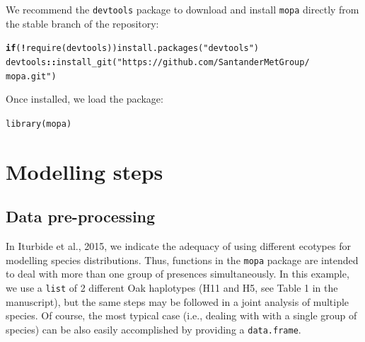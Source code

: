 \documentclass[10pt,a4paper]{article}\usepackage[]{graphicx}\usepackage[]{color}
\makeatletter
\newcommand{\hlstr}[1]{\textcolor[rgb]{0.667,0.267,0}{#1}}%
\newcommand{\hlopt}[1]{\textcolor[rgb]{0,0,0}{\textbf{#1}}}%
\newcommand{\hlstd}[1]{\textcolor[rgb]{0,0,0}{#1}}%
\newcommand{\hlkwa}[1]{\textcolor[rgb]{0.4,0.067,0.067}{\textbf{#1}}}%
\newcommand{\hlkwd}[1]{\textcolor[rgb]{0,0.267,0.4}{#1}}%
\newenvironment{kframe}{%
 \def\at@end@of@kframe{}%
 \ifinner\ifhmode%
  \def\at@end@of@kframe{\end{minipage}}%
  \begin{minipage}{\columnwidth}%
 \fi\fi%
 \def\FrameCommand##1{\hskip\@totalleftmargin \hskip-\fboxsep
 \colorbox{shadecolor}{##1}\hskip-\fboxsep
     \hskip-\linewidth \hskip-\@totalleftmargin \hskip\columnwidth}%
 \MakeFramed {\advance\hsize-\width
   \@totalleftmargin\z@ \linewidth\hsize
   \@setminipage}}%
 {\par\unskip\endMakeFramed%
 \at@end@of@kframe}
\newenvironment{knitrout}{}{} %
\makeatother
\begin{document}
We recommend the \texttt{devtools} package to download and install \texttt{mopa} directly from the stable branch of the repository:

\begin{knitrout}
\color{fgcolor}\begin{kframe}
\begin{alltt}
\hlkwa{if} \hlstd{(}\hlopt{!}\hlkwd{require}\hlstd{(devtools))} \hlkwd{install.packages}\hlstd{(}\hlstr{"devtools"}\hlstd{)}
\hlstd{devtools}\hlopt{::}\hlkwd{install_git}\hlstd{(}\hlstr{"https://github.com/SantanderMetGroup/
                      mopa.git"}\hlstd{)}
\end{alltt}
\end{kframe}
\end{knitrout}

Once installed, we load the package:

\begin{knitrout}
\color{fgcolor}\begin{kframe}
\begin{alltt}
\hlkwd{library}\hlstd{(mopa)}
\end{alltt}


{\ttfamily\noindent\itshape\color{messagecolor}{\#\# Loading required package: raster\\\#\# Loading required package: sp}}\end{kframe}
\end{knitrout}

\section{Modelling steps}
\subsection{Data pre-processing}

In Iturbide et al., 2015, we indicate the adequacy of using different ecotypes for modelling species distributions. Thus, functions in the \texttt{mopa} package are intended to deal with more than one group of presences simultaneously. In this example, we use a \texttt{list} of 2 different Oak haplotypes (H11 and H5, see Table 1 in the manuscript), but the same steps may be followed in a joint analysis of multiple species. Of course, the most typical case (i.e., dealing with with a single group of species) can be also easily accomplished by providing a \texttt{data.frame}. 
\end{document}
